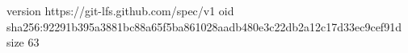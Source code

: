 version https://git-lfs.github.com/spec/v1
oid sha256:92291b395a3881bc88a65f5ba861028aadb480e3c22db2a12c17d33ec9cef91d
size 63
